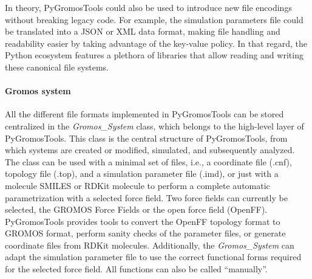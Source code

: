 In theory, PyGromosTools could also be used to introduce new file encodings without breaking legacy code. For example, the simulation parameters file could be translated into a JSON\cite{Pezoa2016} or XML\cite{Bray2008} data format, making file handling and readability easier by taking advantage of the key-value policy. In that regard, the Python ecosystem features a plethora of libraries that allow reading and writing these canonical file systems.


\paragraph{Gromos system}
All the different file formats implemented in PyGromosTools can be stored centralized in the \textit{Gromos\_System} class, which belongs to the high-level layer of PyGromosTools. This class is the central structure of PyGromosTools, from which systems are created or modified, simulated, and subsequently analyzed. The class can be used with a minimal set of files, i.e., a coordinate file (.cnf), topology file (.top), and a simulation parameter file (.imd), or just with a molecule SMILES or RDKit molecule to perform a complete automatic parametrization with a selected force field.
%
Two force fields can currently be selected, the GROMOS Force Fields or the open force field (OpenFF).\cite{Qiu2021} PyGromosTools provides tools to convert the OpenFF topology format to GROMOS format, perform sanity checks of the parameter files, or generate coordinate files from RDKit molecules. Additionally, the \textit{Gromos\_System} can adapt the simulation parameter file to use the correct functional forms required for the selected force field.
All functions can also be called ``manually''.

